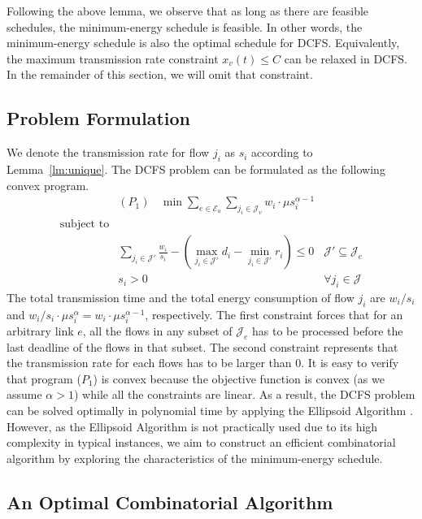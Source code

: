\documentclass[10pt, conference, compsocconf]{IEEEtran}
\begin{document}
Following the above lemma, we observe that as long as there are feasible schedules, the minimum-energy schedule is feasible. In other words, the minimum-energy schedule is also the optimal schedule for DCFS. Equivalently, the maximum transmission rate constraint $x_v(t) \leq C$ can be relaxed in DCFS. In the remainder of this section, we will omit that constraint.

\subsection{Problem Formulation}
We denote the transmission rate for flow $j_i$ as $s_i$ according to Lemma~\ref{lm:unique}.
The DCFS problem can be formulated as the following convex program.
\begin{equation}
\begin{aligned}
&(P_1)~~~~\min  \sum_{e \in \mathcal{E}_a} \sum_{j_i \in \mathcal{J}_v} w_i \cdot \mu s_i^{\alpha-1}  \\
\text{subject to}  \\
& \sum_{j_i \in \mathcal{J}'} \frac{w_i}{s_i} - (\max_{j_i \in \mathcal{J}'}d_i - \min_{j_i \in \mathcal{J}'}r_i) \leq 0 & \mathcal{J}' \subseteq \mathcal{J}_e  \\
& s_i > 0& \forall j_i \in \mathcal{J}
\end{aligned}
\nonumber
\end{equation}
The total transmission time and the total energy consumption of flow $j_i$ are $w_i/s_i$ and $w_i/s_i \cdot \mu s_i^{\alpha}=w_i\cdot\mu s_i^{\alpha-1}$, respectively. The first constraint forces that for an arbitrary link $e$, all the flows in any subset of $\mathcal{J}_e$ has to be processed before the last deadline of the flows in that subset. The second constraint represents that the transmission rate for each flows has to be larger than 0. It is easy to verify that program ($P_1$) is convex because the objective function is convex (as we assume $\alpha > 1$) while all the constraints are linear. As a result, the DCFS problem can be solved optimally in polynomial time by applying the Ellipsoid Algorithm \cite{Nesterov-Ellipsoid-1994}. However, as the Ellipsoid Algorithm is not practically used due to its high complexity in typical instances, we aim to construct an efficient combinatorial algorithm by exploring the characteristics of the minimum-energy schedule.

\subsection{An Optimal Combinatorial Algorithm}
\end{document}
